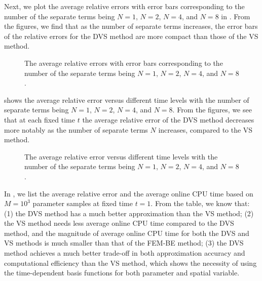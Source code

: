 \documentclass[10pt,a4paper]{article}
\numberwithin{equation}{section}
\numberwithin{lemma}{section}
\numberwithin{example}{section}
\numberwithin{definition}{section}
\numberwithin{assumption}{section}
\numberwithin{theorem}{section}
\numberwithin{proposition}{section}
\numberwithin{corollary}{section}
\numberwithin{remark}{section}
\begin{document}
    Next, we plot the average relative errors with error bars corresponding to the number of the separate terms being $N=1$, $N=2$, $N=4$, and $N=8$ in . From the figures, we find that as the number of separate terms increases, the error bars of the relative errors for the DVS method are more compact than those of the VS method.
	\begin{figure}[htbp]
		\centering
		\caption{The average relative errors with error bars corresponding to the number of the separate terms being $N=1$, $N=2$, $N=4$, and $N=8$.}
		\label{fig1.2}
	\end{figure}
	
      shows the average relative error versus different time levels with the number of separate terms being $N=1$, $N=2$, $N=4$, and $N=8$. From the figures, we see that at each fixed time $t$ the average relative error of the DVS method decreases more notably as the number of separate terms $N$ increases, compared to the VS method.

	\begin{figure}[htbp]
		\centering
		\caption{The average relative error versus different time levels with the number of the separate terms being $N=1$, $N=2$, $N=4$, and $N=8$.}
		\label{fig1.3}
	\end{figure}

 
In , we list the average relative error and the average online CPU time based on $M=10^3$ parameter samples at fixed time $t=1$. From the table, we know that:
(1) the DVS method has a much better approximation than the VS method;
(2) the VS method needs less average online CPU time compared to the DVS method, and the magnitude of average online CPU time for both the DVS and VS methods is much smaller than that of the FEM-BE method;
(3) the DVS method achieves a much better trade-off in both approximation accuracy and computational efficiency than the VS method, which shows the necessity of using the time-dependent basis functions for both parameter and spatial variable.
	
\end{document}
